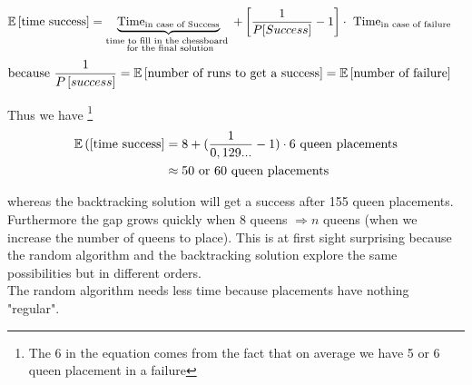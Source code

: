 

\begin{align*}
\mathbb{E}\left[ \text{time success}\right]&=\underbrace{\text{Time}_{\text{in case of Success}}}_{\substack{\text{time to fill in the chessboard }\\\text{ for the final solution}}} + \left[\frac{1}{P[Success]}-1\right]\cdot \text{ Time}_{\text{in case of failure}}
\end{align*}
\begin{align*}
\text{because } \frac{1}{P\left[success\right]}&=\mathbb{E}\left[\text{number of runs to get a success}\right]=\mathbb{E}\left[\text{number of failure}\right]
\end{align*}


Thus we have \footnote{The 6 in the equation comes from the fact that on average we have 5 or 6 queen placement in a failure}
\begin{align*}
\mathbb{E}\left([\text{time success}\right]&=8+(\frac{1}{0,129...}-1)\cdot 6 \text{ queen placements}\\
&\approx 50\text{ or }60\text{ queen placements}
\end{align*}

whereas the backtracking solution will get a success after 155 queen placements.\\

Furthermore the gap grows quickly when 8 queens $\Rightarrow n$ queens (when we increase the number of queens to place). This is at first sight surprising because the random algorithm and the backtracking solution explore the same possibilities but in different orders.\\

The random algorithm needs less time because placements have nothing "regular".